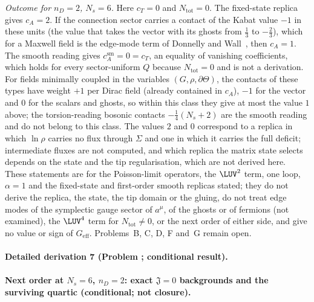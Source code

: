 \emph{Outcome for \(n_D=2\), \(N_s=6\).} Here \(c_T=0\) and \(N_{\mathrm{tot}}=0\). The fixed-state replica gives \(c_A=2\). If the connection sector carries a contact of the Kabat value \(-1\) in these units (the value that takes the vector with its ghosts from \(\tfrac13\) to \(-\tfrac23\)), which for a Maxwell field is the edge-mode term of Donnelly and Wall~\cite{DonnellyWall2016}, then \(c_A=1\). The smooth reading gives \(c_A^{\mathrm{sm}}=0=c_T\), an equality of vanishing coefficients, which holds for every sector-uniform \(Q\) because \(N_{\mathrm{tot}}=0\) and is not a derivation. For fields minimally coupled in the variables \((G,\rho,\partial\Theta)\), the contacts of these types have weight \(+1\) per Dirac field (already contained in \(c_A\)), \(-1\) for the vector and \(0\) for the scalars and ghosts, so within this class they give at most the value \(1\) above; the torsion-reading bosonic contacts \(-\tfrac14(N_s+2)\) are the smooth reading and do not belong to this class. The values \(2\) and \(0\) correspond to a replica in which \(\ln\rho\) carries no flux through \(\Sigma\) and one in which it carries the full deficit; intermediate fluxes are not computed, and which replica the matrix state selects depends on the state and the tip regularisation, which are not derived here. These statements are for the Poisson-limit operators, the \(\LUV^2\) term, one loop, \(\alpha=1\) and the fixed-state and first-order smooth replicas stated; they do not derive the replica, the state, the tip domain or the gluing, do not treat edge modes of the symplectic gauge sector of \(a^\mu\), of the ghosts or of fermions (not examined), the \(\LUV^4\) term for \(N_{\mathrm{tot}}\neq0\), or the next order of either side, and give no value or sign of \(G_{\mathrm{eff}}\). Problems~B, C, D, F and~G remain open.



\paragraph{Detailed derivation 7 (Problem ; conditional result).} \label{ref:detail-6} %



\paragraph{Next order at \(N_s=6\), \(n_D=2\): exact \(\mathfrak J=0\) backgrounds and the surviving quartic (conditional; not closure).}

